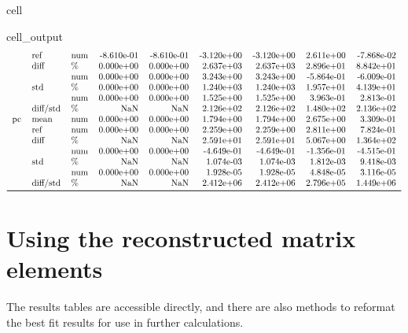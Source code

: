 \documentclass[letterpaper,table,10pt,english]{jupyterBook}
\begin{document}
\begin{sphinxuseclass}{cell}
\begin{sphinxVerbatimOutput}
\begin{sphinxuseclass}{cell_output}
\begin{equation*}
\begin{split}
\begin{tabular}{lllrrrrrr}
   & ref & num & -8.610e-01 & -8.610e-01 & -3.120e+00 & -3.120e+00 &  2.611e+00 & -7.868e-02 \\
   & diff & \% &  0.000e+00 &  0.000e+00 &  2.637e+03 &  2.637e+03 &  2.896e+01 &  8.842e+01 \\
   &          & num &  0.000e+00 &  0.000e+00 &  3.243e+00 &  3.243e+00 & -5.864e-01 & -6.009e-01 \\
   & std & \% &  0.000e+00 &  0.000e+00 &  1.240e+03 &  1.240e+03 &  1.957e+01 &  4.139e+01 \\
   &          & num &  0.000e+00 &  0.000e+00 &  1.525e+00 &  1.525e+00 &  3.963e-01 &  2.813e-01 \\
   & diff/std & \% &        NaN &        NaN &  2.126e+02 &  2.126e+02 &  1.480e+02 &  2.136e+02 \\
pc & mean & num &  0.000e+00 &  0.000e+00 &  1.794e+00 &  1.794e+00 &  2.675e+00 &  3.309e-01 \\
   & ref & num &  0.000e+00 &  0.000e+00 &  2.259e+00 &  2.259e+00 &  2.811e+00 &  7.824e-01 \\
   & diff & \% &        NaN &        NaN &  2.591e+01 &  2.591e+01 &  5.067e+00 &  1.364e+02 \\
   &          & num &  0.000e+00 &  0.000e+00 & -4.649e-01 & -4.649e-01 & -1.356e-01 & -4.515e-01 \\
   & std & \% &        NaN &        NaN &  1.074e-03 &  1.074e-03 &  1.812e-03 &  9.418e-03 \\
   &          & num &  0.000e+00 &  0.000e+00 &  1.928e-05 &  1.928e-05 &  4.848e-05 &  3.116e-05 \\
   & diff/std & \% &        NaN &        NaN &  2.412e+06 &  2.412e+06 &  2.796e+05 &  1.449e+06 \\
\bottomrule
\end{tabular}\end{split}
\end{equation*}
\end{sphinxuseclass}\end{sphinxVerbatimOutput}

\end{sphinxuseclass}

\section{Using the reconstructed matrix elements}
\label{\detokenize{part2/case-study-N2_290723:using-the-reconstructed-matrix-elements}}
\sphinxAtStartPar
The results tables are accessible directly, and there are also methods to reformat the best fit results for use in further calculations.
\end{document}
